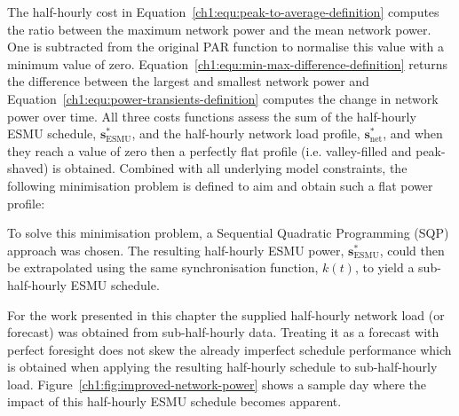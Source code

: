 






The half-hourly cost in Equation~\ref{ch1:equ:peak-to-average-definition} computes the ratio between the maximum network power and the mean network power.
One is subtracted from the original PAR function to normalise this value with a minimum value of zero.
Equation~\ref{ch1:equ:min-max-difference-definition} returns the difference between the largest and smallest network power and Equation~\ref{ch1:equ:power-transients-definition} computes the change in network power over time.
All three costs functions assess the sum of the half-hourly ESMU schedule, $\textbf{s}^*_\text{ESMU}$, and the half-hourly network load profile, $\textbf{s}^*_\text{net}$, and when they reach a value of zero then a perfectly flat profile (i.e. valley-filled and peak-shaved) is obtained.
Combined with all underlying model constraints, the following minimisation problem is defined to aim and obtain such a flat power profile:



To solve this minimisation problem, a Sequential Quadratic Programming (SQP) approach was chosen.
The resulting half-hourly ESMU power, $\textbf{s}^*_\text{ESMU}$, could then be extrapolated using the same synchronisation function, $k(t)$, to yield a sub-half-hourly ESMU schedule.

For the work presented in this chapter the supplied half-hourly network load (or forecast) was obtained from sub-half-hourly data.
Treating it as a forecast with perfect foresight does not skew the already imperfect schedule performance which is obtained when applying the resulting half-hourly schedule to sub-half-hourly load.
Figure~\ref{ch1:fig:improved-network-power} shows a sample day where the impact of this half-hourly ESMU schedule becomes apparent.

